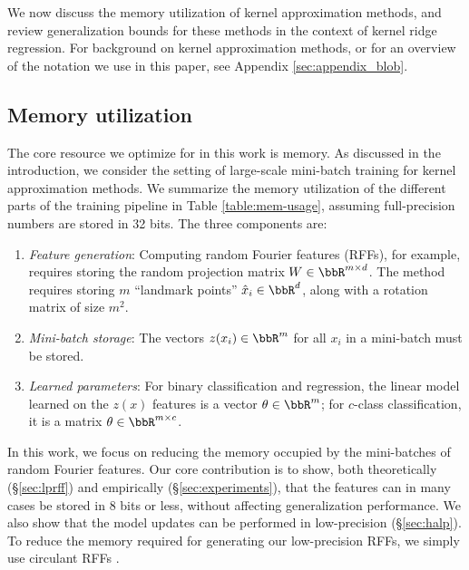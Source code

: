 We now discuss the memory utilization of kernel approximation methods, and review generalization bounds for these methods in the context of kernel ridge regression. For background on kernel approximation methods, or for an overview of the notation we use in this paper, see Appendix \ref{sec:appendix_blob}.

\subsection{Memory utilization}
\label{subsec:memory_utils}
The core resource we optimize for in this work is memory.  As discussed in the introduction, we consider the setting of large-scale mini-batch training for kernel approximation methods. We summarize the memory utilization of the different parts of the training pipeline in Table \ref{table:mem-usage}, assuming full-precision numbers are stored in 32 bits. The three components are:
\begin{enumerate}
	\item \textit{Feature generation}: Computing random Fourier features (RFFs), for example, requires storing the random projection matrix $W \in \RR^{m\times d}$. The \Nystrom method requires storing $m$ ``landmark points'' $\hx_i \in \RR^d$, along with a rotation matrix of size $m^2$.
	\item \textit{Mini-batch storage}: The vectors $z(x_i)\in\RR^m$ for all $x_i$ in a mini-batch must be stored.
	\item \textit{Learned parameters}: For binary classification and regression, the linear model learned on the $z(x)$ features is a vector $\theta \in \RR^m$; for $c$-class classification, it is a matrix $\theta \in \RR^{m\times c}$.	
\end{enumerate}

In this work, we focus on reducing the memory occupied by the mini-batches of random Fourier features. Our core contribution is to show, both theoretically (\S\ref{sec:lprff}) and empirically (\S\ref{sec:experiments}), that the features can in many cases be stored in 8 bits or less, without affecting generalization performance. We also show that the model updates can be performed in low-precision  (\S\ref{sec:halp}). To reduce the memory required for generating our low-precision RFFs, we simply use circulant RFFs \cite{yu15}.


